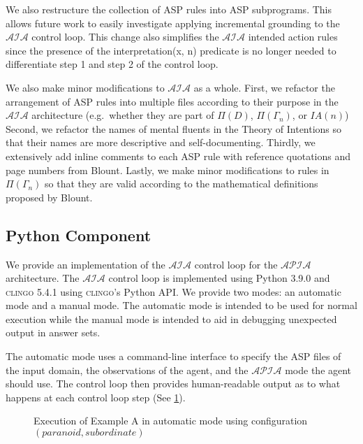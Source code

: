 We also restructure the collection of ASP rules into ASP subprograms.
This allows future work to easily investigate applying incremental grounding to the $\mathcal{AIA}$ control loop.
This change also simplifies the $\mathcal{AIA}$ intended action rules since the presence of the interpretation(x, n) predicate is no longer needed to differentiate step 1 and step 2 of the control loop.

We also make minor modifications to $\mathcal{AIA}$ as a whole.
First, we refactor the arrangement of ASP rules into multiple files according to their purpose in the $\mathcal{AIA}$ architecture (e.g.~whether they are part of $\Pi(D)$, $\Pi(\Gamma_n)$, or $IA(n)$)
Second, we refactor the names of mental fluents in the Theory of Intentions so that their names are more descriptive and self-documenting.
Thirdly, we extensively add inline comments to each ASP rule with reference quotations and page numbers from Blount.
Lastly, we make minor modifications to rules in $\Pi(\Gamma_n)$ so that they are valid according to the mathematical definitions proposed by Blount.

\subsection{Python Component}

We provide an implementation of the $\mathcal{AIA}$ control loop for the $\mathcal{APIA}$ architecture.
The $\mathcal{AIA}$ control loop is implemented using Python 3.9.0 and \textsc{clingo} 5.4.1 using \textsc{clingo}'s Python API.
We provide two modes: an automatic mode and a manual mode.
The automatic mode is intended to be used for normal execution while the manual mode is intended to aid in debugging unexpected output in answer sets.

The automatic mode uses a command-line interface to specify the ASP files of the input domain, the observations of the agent, and the $\mathcal{APIA}$ mode the agent should use.
The control loop then provides human-readable output as to what happens at each control loop step (See \cref{fig:apia_example_a_execution_paraniod_subordinate}).

\begin{figure}[h]
    \centering
    
    \caption{Execution of Example A in automatic mode using configuration $(paranoid, subordinate)$}
    \label{fig:apia_example_a_execution_paraniod_subordinate}
\end{figure}


